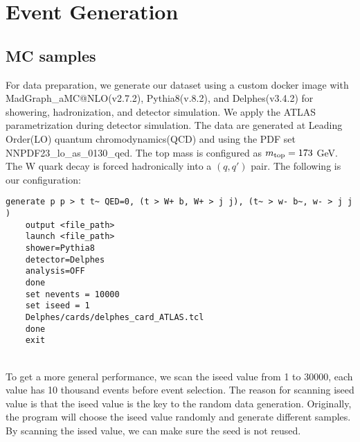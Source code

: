 \chapter{Event Generation}\label{Event Generation}



\section{MC samples}\label{sec:MC sample}
For data preparation, we generate our dataset using a custom docker image with MadGraph\_aMC@NLO(v2.7.2), Pythia8(v.8.2), and Delphes(v3.4.2) for showering, hadronization, and detector simulation. We apply the ATLAS parametrization during detector simulation.  The data are generated at Leading Order(LO) quantum chromodynamics(QCD) and using the PDF set NNPDF23\_lo\_as\_0130\_qed. The top mass is configured as $m_{\rm top}=173$ GeV. The W quark decay is forced hadronically into a $(q, q')$ pair. The following is our configuration:
\\
\begin{adjustbox}{max width=\textwidth}
\centering
\begin{lstlisting}[caption={Configuration for generating samples. The ``iseed'' is just a placeholder, it will be changed when generating samples.},captionpos=b]
	generate p p > t t~ QED=0, (t > W+ b, W+ > j j), (t~ > w- b~, w- > j j ) 
	output <file_path> 
	launch <file_path> 
	shower=Pythia8  
	detector=Delphes 
	analysis=OFF 
	done  
	set nevents = 10000 
	set iseed = 1 
	Delphes/cards/delphes_card_ATLAS.tcl
	done 
	exit 
\end{lstlisting}
\end{adjustbox}
\\
To get a more general performance, we scan the iseed value from 1 to 30000, each value has 10 thousand events before event selection. The reason for scanning iseed value is that the iseed value is the key to the random data generation. Originally, the program will choose the iseed value randomly and generate different samples. By scanning the issed value, we can make sure the seed is not reused. 





